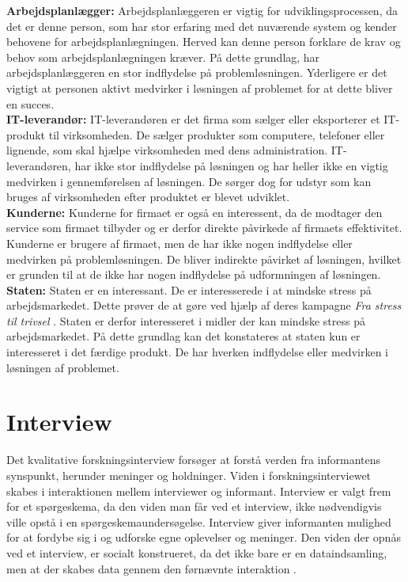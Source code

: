 \textbf{Arbejdsplanlægger:}
Arbejdsplanlæggeren er vigtig for udviklingsprocessen, da det er denne person, som har stor erfaring med det nuværende system og kender behovene for arbejdsplanlægningen. Herved kan denne person forklare de krav og behov som arbejdsplanlægningen kræver. På dette grundlag, har arbejdsplanlæggeren en stor indflydelse på problemløsningen. Yderligere er det vigtigt at personen aktivt medvirker i løsningen af problemet for at dette bliver en succes. \\

\textbf{IT-leverandør:}
IT-leverandøren er det firma som sælger eller eksporterer et IT-produkt til virksomheden. De sælger produkter som computere, telefoner eller lignende, som skal hjælpe virksomheden med dens administration.
IT-leverandøren, har ikke stor indflydelse på løsningen og har heller ikke en vigtig medvirken i gennemførelsen af løsningen. De sørger dog for udstyr som kan bruges af virksomheden efter produktet er blevet udviklet.\\

\textbf{Kunderne:}
Kunderne for firmaet er også en interessent, da de modtager den service som firmaet tilbyder og er derfor direkte påvirkede af firmaets effektivitet. Kunderne er brugere af firmaet, men de har ikke nogen indflydelse eller medvirken på problemløsningen. De bliver indirekte påvirket af løsningen, hvilket er grunden til at de ikke har nogen indflydelse på udformningen af løsningen.\\

\textbf{Staten:}
Staten er en interessant. De er interesserede i at mindske stress på arbejdsmarkedet. Dette prøver de at gøre ved hjælp af deres kampagne \textit{Fra stress til trivsel} \citep{Arbejdsmiljoe_Arbejdspladser}. Staten er derfor interesseret i midler der kan mindske stress på arbejdsmarkedet. På dette grundlag kan det konstateres at staten kun er interesseret i det færdige produkt. De har hverken indflydelse eller medvirken i løsningen af problemet.

\section{Interview}
Det kvalitative forskningsinterview forsøger at forstå verden fra informantens synspunkt, herunder meninger og holdninger. Viden i forskningsinterviewet skabes i interaktionen mellem interviewer og informant. Interview er valgt frem for et spørgeskema, da den viden man får ved et interview, ikke nødvendigvis ville opstå i en spørgeskemaundersøgelse. Interview giver informanten mulighed for at fordybe sig i og udforske egne oplevelser og meninger. Den viden der opnås ved et interview, er socialt konstrueret, da det ikke bare er en dataindsamling, men at der skabes data gennem den førnævnte interaktion \citep{kvale2009}.

